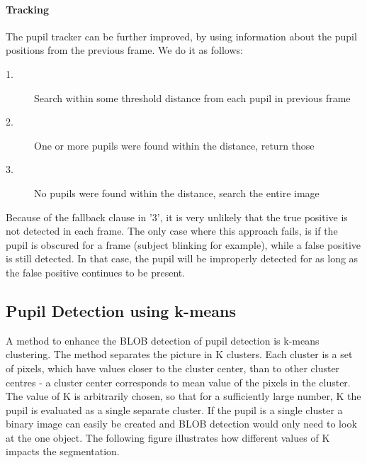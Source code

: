 \documentclass[a4paper,11pt]{article}
\begin{document}
\paragraph{Tracking} The pupil tracker can be further improved, by using information about the pupil positions from the previous frame. We do it as follows:
\begin{description}
\item[1.]{Search within some threshold distance from each pupil in previous frame}
\item[2.]{One or more pupils were found within the distance, return those}
\item[3.]{No pupils were found within the distance, search the entire image}
\end{description}
Because of the fallback clause in '3', it is very unlikely that the true positive is not detected in each frame. The only case where this approach fails, is if the pupil is obscured for a frame (subject blinking for example), while a false positive is still detected. In that case, the pupil will be improperly detected for as long as the false positive continues to be present.

\subsection{Pupil Detection using k-means}
A method to enhance the BLOB detection of pupil detection is k-means clustering. The method separates the picture in K clusters. Each cluster is a set of pixels, which have values closer to the cluster center, than to other cluster centres -  a cluster center corresponds to mean value of the pixels in the cluster. The value of K is arbitrarily chosen, so that for a sufficiently large number, K the pupil is evaluated as a single separate cluster. If the pupil is a single cluster a binary image can easily be created and BLOB detection would only need to look at the one object. The following figure illustrates how different values of K impacts the segmentation.
\end{document}
